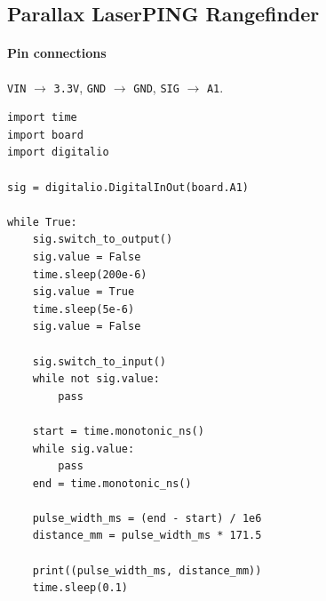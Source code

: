 \documentclass[11pt]{article}
\begin{document}
\subsection{Parallax LaserPING Rangefinder}
\paragraph{Pin connections} \texttt{VIN} $\rightarrow$ \texttt{3.3V}, \texttt{GND} $\rightarrow$ \texttt{GND}, \texttt{SIG} $\rightarrow$ \texttt{A1}.

\begin{lstlisting}
import time
import board
import digitalio

sig = digitalio.DigitalInOut(board.A1)

while True:
    sig.switch_to_output()
    sig.value = False
    time.sleep(200e-6)
    sig.value = True
    time.sleep(5e-6)
    sig.value = False

    sig.switch_to_input()
    while not sig.value:
        pass

    start = time.monotonic_ns()
    while sig.value:
        pass
    end = time.monotonic_ns()

    pulse_width_ms = (end - start) / 1e6
    distance_mm = pulse_width_ms * 171.5

    print((pulse_width_ms, distance_mm))
    time.sleep(0.1)
\end{lstlisting}
\end{document}
